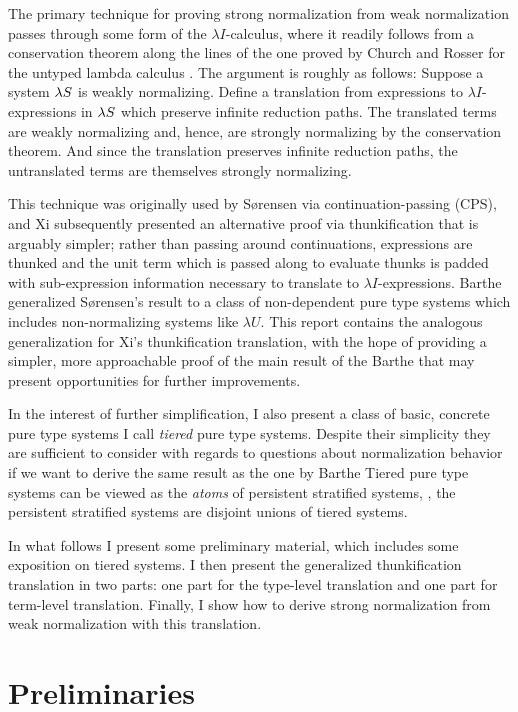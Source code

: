 \documentclass{article}
\begin{document}
The primary technique for proving strong normalization from weak normalization passes through some form of the $\lambda I$-calculus, where it readily follows from a conservation theorem along the lines of the one proved by Church and Rosser for the untyped lambda calculus \cite{church-rosser-1936}.
The argument is roughly as follows:
Suppose a system $\lambda S$ is weakly normalizing.
Define a translation from expressions to $\lambda I$-expressions in $\lambda S$ which preserve infinite reduction paths.
The translated terms are weakly normalizing and, hence, are strongly normalizing by the conservation theorem.
And since the translation preserves infinite reduction paths, the untranslated terms are themselves strongly normalizing.

This technique was originally used by S{\o}rensen \cite{sorensen-1997} via continuation-passing (CPS), and Xi \cite{xi-1997} subsequently presented an alternative proof via thunkification that is arguably simpler; rather than passing around continuations, expressions are thunked and the unit term which is passed along to evaluate thunks is padded with sub-expression information necessary to translate to $\lambda I$-expressions.
Barthe \etal \cite{barthe-et-al-2001} generalized S{\o}rensen's result to a class of non-dependent pure type systems which includes non-normalizing systems like $\lambda U$.
This report contains the analogous generalization for Xi's thunkification translation, with the hope of providing a simpler, more approachable proof of the main result of the Barthe \etal that may present opportunities for further improvements.

In the interest of further simplification, I also present a class of basic, concrete pure type systems I call \textit{tiered} pure type systems.
Despite their simplicity they are sufficient to consider with regards to questions about normalization behavior if we want to derive the same result as the one by Barthe \etal
Tiered pure type systems can be viewed as the \textit{atoms} of persistent stratified systems, \ie, the persistent stratified systems are disjoint unions of tiered systems.

In what follows I present some preliminary material, which includes some exposition on tiered systems.
I then present the generalized thunkification translation in two parts: one part for the type-level translation and one part for term-level translation.
Finally, I show how to derive strong normalization from weak normalization with this translation.

\section{Preliminaries}
\end{document}
